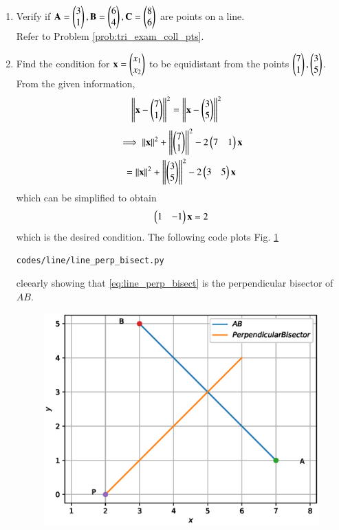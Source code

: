 \renewcommand{\theequation}{\theenumi}
\begin{enumerate}[label=\arabic*.,ref=\thesubsection.\theenumi]


\item Verify if $\mathbf{A} = \begin{pmatrix}3\\1\end{pmatrix}, \mathbf{B} = \begin{pmatrix}6\\4\end{pmatrix}, \mathbf{C} = \begin{pmatrix}8\\6\end{pmatrix}$ are points on a line.
\\
\solution Refer to Problem \ref{prob:tri_exam_coll_pts}.

\item Find the condition for $\mathbf{x} = \begin{pmatrix}x_1\\x_2\end{pmatrix}$ to be equidistant from the points $\begin{pmatrix}7\\1\end{pmatrix}, \begin{pmatrix}3\\5\end{pmatrix}$.
%
\\
\solution From the given information,
%
\begin{align}
\left\lVert\mathbf{x}-\begin{pmatrix}7\\1\end{pmatrix}\right\rVert^2&=\left\lVert\mathbf{x}-\begin{pmatrix}3\\5\end{pmatrix}\right\rVert^2
\end{align}
\begin{multline}
\implies \left\lVert\mathbf{x}\right\rVert^2 + \left\lVert\begin{pmatrix}7\\1\end{pmatrix}\right\rVert^2-2\begin{pmatrix}7&1\end{pmatrix}\mathbf{x} 
\\= 
 \left\lVert\mathbf{x}\right\rVert^2 + \left\lVert\begin{pmatrix}3\\5\end{pmatrix}\right\rVert^2-2\begin{pmatrix}3&5\end{pmatrix}\mathbf{x} 
\end{multline}
%
which can be simplified to obtain
\begin{align}
\label{eq:line_perp_bisect}
\begin{pmatrix}1 & -1\end{pmatrix}\mathbf{x} = 2
\end{align}
%
which is the desired condition.  
The following code plots Fig. \ref{fig:line_perp_bisect}
%
\begin{lstlisting}
codes/line/line_perp_bisect.py
\end{lstlisting}
%
cleearly showing that \eqref{eq:line_perp_bisect} is the perpendicular bisector of $AB$.
\begin{figure}[!ht]
\includegraphics[width=\columnwidth]{./line/figs/line_perp_bisect.eps}
\caption{}
\label{fig:line_perp_bisect}
\end{figure}
%


\end{enumerate}
